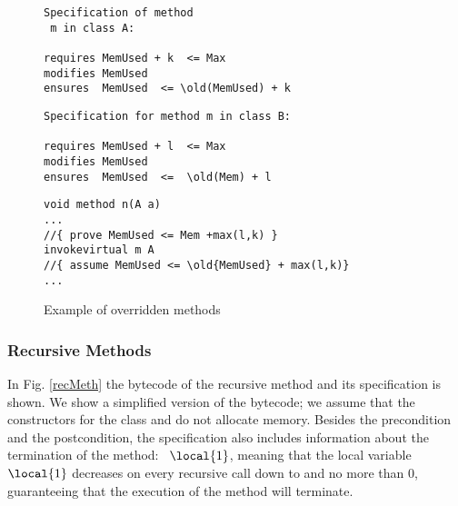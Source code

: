 \begin{figure}[!htp]
\begin{frameit}
\begin{center}
\begin{minipage}[t]{110mm}
\begin{lstlisting}[frame=trbl]
Specification of method
 m in class A:

requires MemUsed + k  <= Max 
modifies MemUsed 
ensures  MemUsed  <= \old(MemUsed) + k
\end{lstlisting}

\begin{lstlisting}[frame=trbl]
Specification for method m in class B:

requires MemUsed + l  <= Max 
modifies MemUsed 
ensures  MemUsed  <=  \old(Mem) + l
\end{lstlisting}

\end{minipage}

\begin{minipage}[t]{110mm}
\begin{lstlisting}[frame=trbl]
void method n(A a)
...
//{ prove MemUsed <= Mem +max(l,k) }
invokevirtual m A
//{ assume MemUsed <= \old{MemUsed} + max(l,k)}
...
\end{lstlisting}
\end{minipage}

\caption{\sc Example of overridden methods}
\label{classExt}
\end{center}
\end{frameit}
\end{figure}


\subsubsection{Recursive Methods} In Fig. \ref{recMeth} the bytecode of the recursive method \methodd{} and its specification is shown. 
 We show a simplified version of the bytecode; we assume that the constructors for the class  and 
 do not allocate memory. Besides the precondition and the postcondition, the specification also includes information 
 about the termination of the method: \variant\ $\local{1}$, meaning that the local variable $\local{1}$ decreases on every recursive call down to and no more than $0$, guaranteeing
 that the execution of the method will terminate.
 

